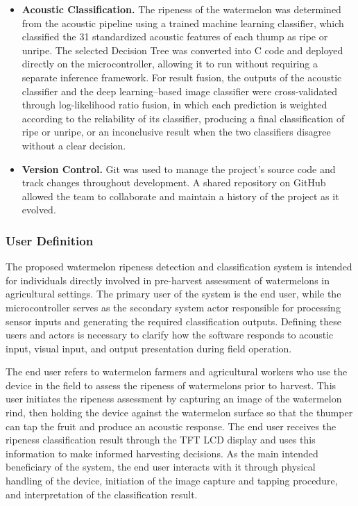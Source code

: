 \begin{thesisprose}
\begin{itemize}
\item \textbf{Acoustic Classification.} The ripeness of the watermelon was determined from the acoustic pipeline using a trained machine learning classifier, which classified the 31 standardized acoustic features of each thump as ripe or unripe. The selected Decision Tree was converted into C code and deployed directly on the microcontroller, allowing it to run without requiring a separate inference framework. For result fusion, the outputs of the acoustic classifier and the deep learning–based image classifier were cross-validated through log-likelihood ratio fusion, in which each prediction is weighted according to the reliability of its classifier, producing a final classification of ripe or unripe, or an inconclusive result when the two classifiers disagree without a clear decision.

\item \textbf{Version Control.} Git was used to manage the project’s source code and track changes throughout development. A shared repository on GitHub allowed the team to collaborate and maintain a history of the project as it evolved.

\end{itemize}

\subsubsection{User Definition}

The proposed watermelon ripeness detection and classification system is intended for individuals directly involved in pre-harvest assessment of watermelons in agricultural settings. The primary user of the system is the end user, while the microcontroller serves as the secondary system actor responsible for processing sensor inputs and generating the required classification outputs. Defining these users and actors is necessary to clarify how the software responds to acoustic input, visual input, and output presentation during field operation.

The end user refers to watermelon farmers and agricultural workers who use the device in the field to assess the ripeness of watermelons prior to harvest. This user initiates the ripeness assessment by capturing an image of the watermelon rind, then holding the device against the watermelon surface so that the thumper can tap the fruit and produce an acoustic response. The end user receives the ripeness classification result through the TFT LCD display and uses this information to make informed harvesting decisions. As the main intended beneficiary of the system, the end user interacts with it through physical handling of the device, initiation of the image capture and tapping procedure, and interpretation of the classification result.


\end{thesisprose}
